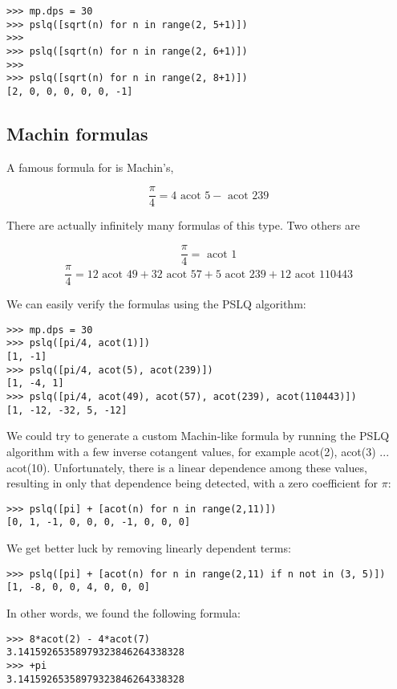 \begin{lstlisting}
>>> mp.dps = 30
>>> pslq([sqrt(n) for n in range(2, 5+1)])
>>>
>>> pslq([sqrt(n) for n in range(2, 6+1)])
>>>
>>> pslq([sqrt(n) for n in range(2, 8+1)])
[2, 0, 0, 0, 0, 0, -1]
\end{lstlisting}



\subsection{Machin formulas}

A famous formula for is Machin's,

\begin{equation}
\frac{\pi}{4} = 4 \text{ acot }5 - \text{ acot } 239
\end{equation}

There are actually infinitely many formulas of this type. Two others are

\begin{equation}
\frac{\pi}{4} = \text{ acot } 1
\end{equation}
\begin{equation}
\frac{\pi}{4} = 12 \text{ acot } 49 + 32 \text{ acot } 57 + 5 \text{ acot } 239 + 12 \text{ acot } 110443
\end{equation}


We can easily verify the formulas using the PSLQ algorithm:

\begin{lstlisting}
>>> mp.dps = 30
>>> pslq([pi/4, acot(1)])
[1, -1]
>>> pslq([pi/4, acot(5), acot(239)])
[1, -4, 1]
>>> pslq([pi/4, acot(49), acot(57), acot(239), acot(110443)])
[1, -12, -32, 5, -12]
\end{lstlisting}


We could try to generate a custom Machin-like formula by running the PSLQ algorithm with a few inverse cotangent values, for example acot(2), acot(3) ... acot(10). Unfortunately, there is a linear dependence among these values, resulting in only that dependence being detected, with a zero coefficient for $\pi$:

\begin{lstlisting}
>>> pslq([pi] + [acot(n) for n in range(2,11)])
[0, 1, -1, 0, 0, 0, -1, 0, 0, 0]
\end{lstlisting}


We get better luck by removing linearly dependent terms:

\begin{lstlisting}
>>> pslq([pi] + [acot(n) for n in range(2,11) if n not in (3, 5)])
[1, -8, 0, 0, 4, 0, 0, 0]
\end{lstlisting}


In other words, we found the following formula:

\begin{lstlisting}
>>> 8*acot(2) - 4*acot(7)
3.14159265358979323846264338328
>>> +pi
3.14159265358979323846264338328
\end{lstlisting}





